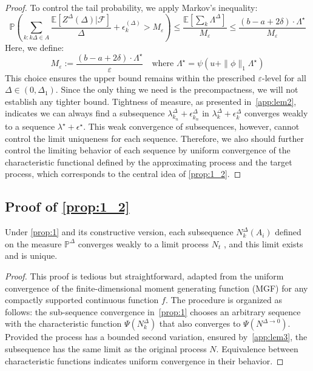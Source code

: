 \documentclass[10pt]{article}
\numberwithin{figure}{section}
\begin{document}
\begin{proof}
To control the tail probability, we apply Markov's inequality:
\[
\mathbb{P}\left( \sum_{k: k\Delta \in A} \frac{\mathbb{E}[Z^\Delta(\Delta)|\mathcal{F}]}{\Delta} + \epsilon_k^{(\Delta)} > M_\varepsilon \right)
\le \frac{ \mathbb{E}[ \sum_{k} \Lambda^\Delta ] }{ M_\varepsilon }
\le \frac{ (b - a + 2\delta) \cdot \Lambda^\star }{ M_\varepsilon }
\]
Here, we define:
\[
M_\varepsilon := \frac{(b - a + 2\delta) \cdot \Lambda^\star}{\varepsilon}
\quad \text{where } \Lambda^\star = \psi(u + \|\phi\|_1 \Lambda^\star)
 \label{bound_1}\]
This choice ensures the upper bound remains within the prescribed \( \varepsilon \)-level for all \( \Delta \in (0, \Delta_1) \).  Since the only thing we need is the precompactness, we will not establish any tighter bound.  Tightness of measure, as presented in~\autoref{app:lem2},  indicates we can always find a subsequence $\lambda_{k_n}^{\Delta}+\epsilon_{k_n}^{\Delta}$ in $\lambda_{k}^{\Delta}+\epsilon_{k}^{\Delta}$ converges weakly to a sequence $\lambda^{\star}+\epsilon^{\star}$.  This weak convergence of subsequences, however, cannot control the limit uniqueness for each sequence. Therefore, we also should further control the limiting behavior of each sequence by uniform convergence of the characteristic functional defined by the approximating process and the target process, which corresponds to the central idea of \autoref{prop:1_2}.
\end{proof}
\subsection{Proof of \autoref{prop:1_2}}

\begin{alemma}
    Under \autoref{prop:1} and its constructive version, each subsequence $N^{\Delta}_k(A_i)$ defined on the measure $\mathbb{P}^{\Delta}$ converges weakly to a limit process $N_t$ , and this limit exists and is unique.
\end{alemma}
\begin{proof}
    This proof is tedious but straightforward, adapted from the uniform convergence of the finite-dimensional  moment generating function (MGF) for any compactly supported continuous function $f$. The procedure is organized as follows: the sub-sequence convergence in~\autoref{prop:1} chooses an arbitrary sequence with the characteristic function $\Psi (N_k^{\Delta})$ that also converges to $\Psi (N^{\Delta\rightarrow 0})$. Provided the process has a bounded second variation, ensured by~\autoref{app:lem3}, the subsequence has the same limit as the original process $N$. Equivalence between characteristic functions indicates uniform convergence in their behavior.
\end{proof}
\end{document}
